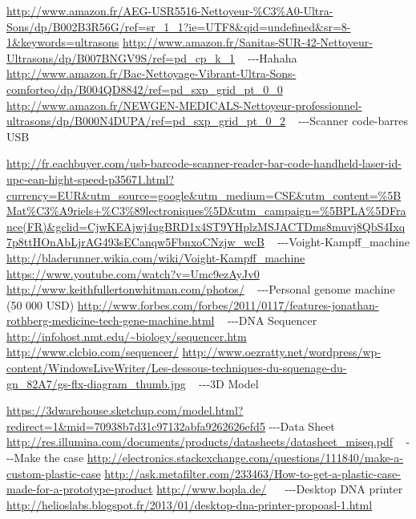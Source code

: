 \href{http://www.amazon.fr/AEG-USR5516-Nettoyeur-?-Ultra-Sons/dp/B002B3R56G/ref=sr_1_1?ie=UTF8&qid=undefined&sr=8-1&keywords=ultrasons}{http://www.amazon.fr/AEG-USR5516-Nettoyeur-\%C3\%A0-Ultra-Sons/dp/B002B3R56G/ref=sr\_1\_1?ie=UTF8\&qid=undefined\&sr=8-1\&keywords=ultrasons}
\url{http://www.amazon.fr/Sanitas-SUR-42-Nettoyeur-Ultrasons/dp/B007BNGV9S/ref=pd_cp_k_1}
~
{}-{}-{}-Hahaha
\url{http://www.amazon.fr/Bac-Nettoyage-Vibrant-Ultra-Sons-comforteo/dp/B004QD8842/ref=pd_sxp_grid_pt_0_0}
\url{http://www.amazon.fr/NEWGEN-MEDICALS-Nettoyeur-professionnel-ultrasons/dp/B000N4DUPA/ref=pd_sxp_grid_pt_0_2}
~
{}-{}-{}-Scanner code-barres USB

\href{http://fr.eachbuyer.com/usb-barcode-scanner-reader-bar-code-handheld-laser-id-upc-ean-hight-speed-p35671.html?currency=EUR&utm_source=google&utm_medium=CSE&utm_content=[Mat?riels
?lectroniques]&utm_campaign=[PLA]France(FR)&gclid=CjwKEAjwj4ugBRD1x4ST9YHplzMSJACTDms8muvj8QbS4Ixq7p8ttHOnAbLjrAG493sECanqw5FbnxoCNzjw_wcB}{http://fr.eachbuyer.com/usb-barcode-scanner-reader-bar-code-handheld-laser-id-upc-ean-hight-speed-p35671.html?currency=EUR\&utm\_source=google\&utm\_medium=CSE\&utm\_content=\%5BMat\%C3\%A9riels+\%C3\%89lectroniques\%5D\&utm\_campaign=\%5BPLA\%5DFrance(FR)\&gclid=CjwKEAjwj4ugBRD1x4ST9YHplzMSJACTDms8muvj8QbS4Ixq7p8ttHOnAbLjrAG493sECanqw5FbnxoCNzjw\_wcB}
~
{}-{}-{}-Voight-Kampff\_machine
\url{http://bladerunner.wikia.com/wiki/Voight-Kampff_machine}
\url{https://www.youtube.com/watch?v=Umc9ezAyJv0}
\url{http://www.keithfullertonwhitman.com/photos/}
~
{}-{}-{}-Personal genome machine (50 000 USD)
\url{http://www.forbes.com/forbes/2011/0117/features-jonathan-rothberg-medicine-tech-gene-machine.html}
~
{}-{}-{}-DNA Sequencer
\url{http://infohost.nmt.edu/~biology/sequencer.htm}
\url{http://www.clcbio.com/sequencer/}
\url{http://www.oezratty.net/wordpress/wp-content/WindowsLiveWriter/Les-dessous-techniques-du-squenage-du-gn_82A7/gs-flx-diagram_thumb.jpg}
~
{}-{}-{}-3D Model

\url{https://3dwarehouse.sketchup.com/model.html?redirect=1&mid=70938b7d31c97132abfa9262626efd5}
{}-{}-{}-Data Sheet
\url{http://res.illumina.com/documents/products/datasheets/datasheet_miseq.pdf}
~
{}-{}-{}-Make the case
\url{http://electronics.stackexchange.com/questions/111840/make-a-custom-plastic-case}
\url{http://ask.metafilter.com/233463/How-to-get-a-plastic-case-made-for-a-prototype-product}
\url{http://www.bopla.de/}
~
~{}-{}-{}-Desktop DNA printer
\url{http://helioslabs.blogspot.fr/2013/01/desktop-dna-printer-propoasl-1.html}

